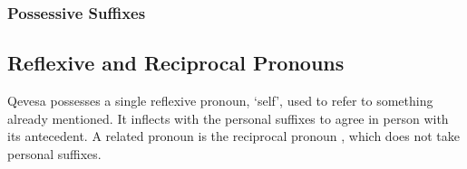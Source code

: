 \documentclass[grammar]{subfiles}
\begin{document}
  \subsubsection{Possessive Suffixes}
  \label{sssec:mn_possessive_suffixes}

  \ToBeWritten

  \newpage
  \subsection{Reflexive and Reciprocal Pronouns}
  \label{ssec:nm_reflexive_pronouns}


   Qevesa possesses a single reflexive pronoun,  ‘self’, used to
   refer to something already mentioned.  It inflects with the personal
   suffixes to agree in person with its antecedent.  A related pronoun is the
   reciprocal pronoun , which does not take personal suffixes.

\end{document}
